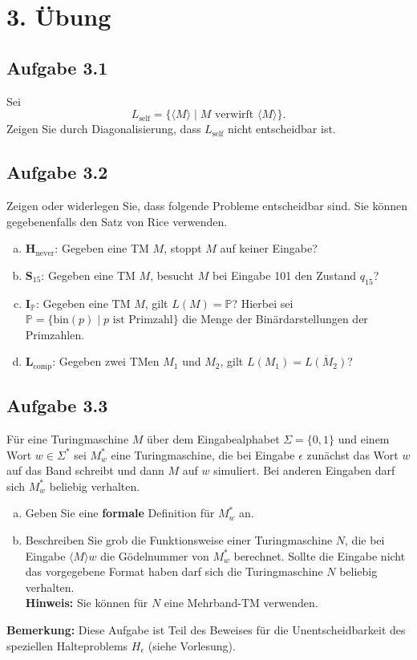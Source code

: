 \section*{3. Übung}
\subsection*{Aufgabe 3.1}
Sei $$L_\text{self} = \{\langle M \rangle \mid M \text{ verwirft } \langle M \rangle \}.$$
Zeigen Sie durch Diagonalisierung, dass $L_\text{self}$ nicht entscheidbar ist.

\subsection*{Aufgabe 3.2}
Zeigen oder widerlegen Sie, dass folgende Probleme entscheidbar sind. Sie können gegebenenfalls den Satz von Rice verwenden.
\begin{enumerate}[(a)]
	\item $\textbf{H}_\text{never}$: Gegeben eine TM $M$, stoppt $M$ auf keiner Eingabe?
	\item $\textbf{S}_{15}$: Gegeben eine TM $M$, besucht $M$ bei Eingabe 101 den Zustand $q_{15}$?
	\item $\textbf{I}_\mathbb{P}$: Gegeben eine TM $M$, gilt $L(M)= \mathbb{P}$? Hierbei sei $\mathbb{P} = \{\text{bin}(p) \mid p \text{ ist Primzahl} \}$ die Menge der Binärdarstellungen der Primzahlen.
	\item $\textbf{L}_\text{comp}$: Gegeben zwei TMen $M_1$ und $M_2$, gilt $L(M_1) = \overline{L(M_2)}$?
\end{enumerate}

\subsection*{Aufgabe 3.3}
Für eine Turingmaschine $M$ über dem Eingabealphabet $\Sigma = \{0,1\}$ und einem Wort $w \in \Sigma^*$ sei $M_w^*$ eine Turingmaschine, die bei Eingabe $\epsilon$ zunächst das Wort $w$ auf das Band schreibt und dann $M$ auf $w$ simuliert. Bei anderen Eingaben darf sich $M_w^*$ beliebig verhalten.
\begin{enumerate}[(a)]
	\item Geben Sie eine \textbf{formale} Definition für $M_w^*$ an.
	\item Beschreiben Sie grob die Funktionsweise einer Turingmaschine $N$, die bei Eingabe $\langle M \rangle w$ die Gödelnummer von $M_w^*$ berechnet. Sollte die Eingabe nicht das vorgegebene Format haben darf sich die Turingmaschine $N$ beliebig verhalten.\\
	\textbf{Hinweis:} Sie können für $N$  eine Mehrband-TM verwenden.
\end{enumerate}
\textbf{Bemerkung:} Diese Aufgabe ist Teil des Beweises für die Unentscheidbarkeit des speziellen Halteproblems $H_\epsilon$ (siehe Vorlesung).